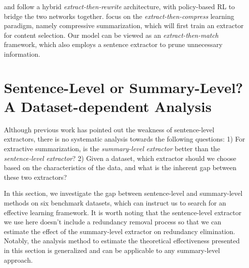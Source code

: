 \citet{chen2018fast} and \citet{bae2019summary} follow a hybrid \textit{extract-then-rewrite} architecture, with policy-based RL to bridge the two networks together.
\citet{lebanoff2019scoring,xu-durrett-2019-neural,mendes2019jointly} focus on the \textit{extract-then-compress} learning paradigm, namely compressive summarization, which will first train an extractor for content selection.
Our model can be viewed as an \textit{extract-then-match} framework, which also employs a  sentence extractor to prune unnecessary information.

\section{Sentence-Level or Summary-Level? A Dataset-dependent Analysis}
\label{sec:investigation}

Although previous work has pointed out the weakness of sentence-level extractors, there is no systematic analysis towards the following questions:
1) For extractive summarization, is the \emph{summary-level extractor} better than the \emph{sentence-level extractor}?
2) Given a dataset, which extractor should we choose based on the characteristics of the data, and what is the inherent gap between these two extractors?

In this section, we investigate the gap between sentence-level and summary-level methods on six benchmark datasets, which can instruct us to search for an effective learning framework. It is worth noting that the sentence-level extractor we use here doesn't include a redundancy removal process so that we can estimate the effect of the summary-level extractor on redundancy elimination.
Notably, the analysis method to estimate the theoretical effectiveness presented in this section is generalized and can be applicable to any summary-level approach.

